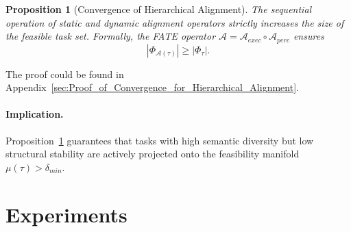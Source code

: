 \documentclass{article}
\theoremstyle{plain}
\newtheorem{proposition}[theorem]{Proposition}
\theoremstyle{definition}
\theoremstyle{remark}
\begin{document}

\begin{proposition}[Convergence of Hierarchical Alignment]
\label{prop:hierarchical_convergence}
The sequential operation of static and dynamic alignment operators strictly increases the size of the feasible task set. Formally, the FATE operator $\mathcal{A} = \mathcal{A}_{exec} \circ \mathcal{A}_{perc}$ ensures
\begin{equation}
    | \Phi_{\mathcal{A}(\tau)} | \ge | \Phi_\tau |.
\end{equation}
\end{proposition}
The proof could be found in Appendix~\ref{sec:Proof_of_Convergence_for_Hierarchical_Alignment}. 
\paragraph{Implication.} Proposition~\ref{prop:hierarchical_convergence} guarantees that tasks with high semantic diversity but low structural stability are actively projected onto the feasibility manifold $\mu(\tau) > \delta_{min}$.












\section{Experiments}
\label{sec:experiments}
\end{document}
